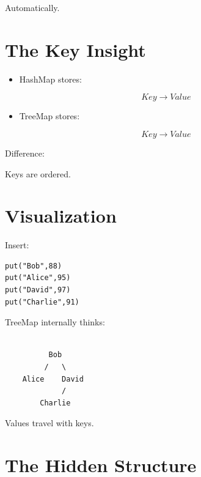 \documentclass[11pt,a4paper]{book}
\begin{document}
\textcolor{RosettaRoyalPurple}{Automatically}.


\section{The Key Insight}
\begin{itemize}
\item[>] {HashMap stores:

\[
Key
\rightarrow
Value
\]}


\item[>] {TreeMap stores:

\[
Key
\rightarrow
Value
\]}
\end{itemize}

Difference:


Keys are {\ttfamily\textcolor{RosettaDeepGreen}{ordered}}.


\section{Visualization}

Insert:

\begin{verbatim} 
put("Bob",88)
put("Alice",95)
put("David",97)
put("Charlie",91)
\end{verbatim}


TreeMap internally thinks:

\begin{verbatim}

          Bob
         /   \
    Alice    David
             /
        Charlie
\end{verbatim}


Values travel with keys.

\section{The Hidden Structure}
\end{document}
